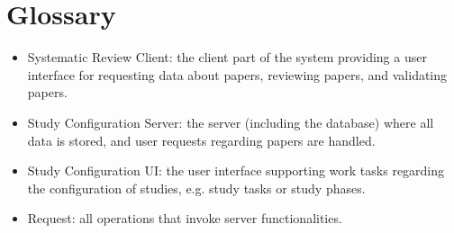\section{Glossary}

\begin{itemize}

\item Systematic Review Client: the client part of the system providing a user interface for requesting data about papers, reviewing papers, and validating papers.
\item Study Configuration Server: the server (including the database) where all data is stored, and user requests regarding papers are handled.
\item Study Configuration UI: the user interface supporting work tasks regarding the configuration of studies, e.g. study tasks or study phases. 
\item Request: all operations that invoke server functionalities. 
\end{itemize}
